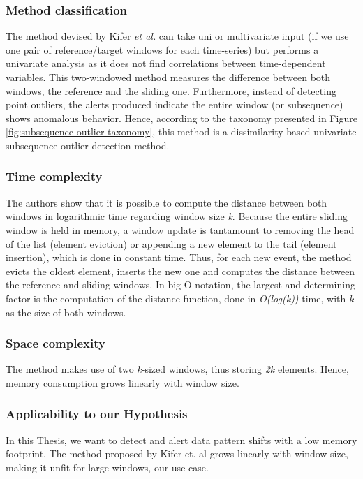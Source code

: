 \subsubsection*{Method classification}
The method devised by Kifer \emph{et al.} can take uni or multivariate input (if we use one pair of reference/target windows for each time-series) but performs a univariate analysis as it does not find correlations between time-dependent variables. This two-windowed method measures the difference between both windows, the reference and the sliding one. Furthermore, instead of detecting point outliers, the alerts produced indicate the entire window (or subsequence) shows anomalous behavior. Hence, according to the taxonomy presented in Figure \ref{fig:subsequence-outlier-taxonomy}, this method is a dissimilarity-based univariate subsequence outlier detection method.

\subsubsection*{Time complexity}
The authors show that it is possible to compute the distance between both windows in logarithmic time regarding window size \textit{k}. Because the entire sliding window is held in memory, a window update is tantamount to removing the head of the list (element eviction) or appending a new element to the tail (element insertion), which is done in constant time. Thus, for each new event, the method evicts the oldest element, inserts the new one and computes the distance between the reference and sliding windows. In big O notation, the largest and determining factor is the computation of the distance function, done in \textit{O(log(k))} time, with \textit{k} as the size of both windows.

\subsubsection*{Space complexity}
The method makes use of two \textit{k}-sized windows, thus storing \textit{2k} elements. Hence, memory consumption grows linearly with window size.

\subsubsection*{Applicability to our Hypothesis}
In this Thesis, we want to detect and alert data pattern shifts with a low memory footprint. The method proposed by Kifer et. al grows linearly with window size, making it unfit for large windows, our use-case.

